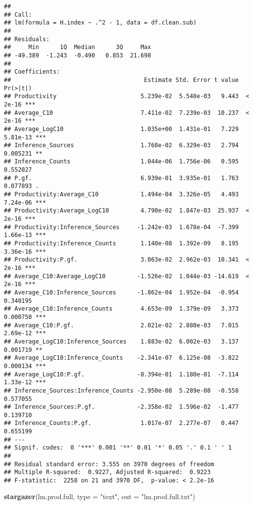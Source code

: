 \documentclass[
]{article}
\newenvironment{Shaded}{\begin{snugshade}}{\end{snugshade}}
\newcommand{\AttributeTok}[1]{\textcolor[rgb]{0.13,0.29,0.53}{#1}}
\newcommand{\FunctionTok}[1]{\textcolor[rgb]{0.13,0.29,0.53}{\textbf{#1}}}
\newcommand{\NormalTok}[1]{#1}
\newcommand{\StringTok}[1]{\textcolor[rgb]{0.31,0.60,0.02}{#1}}
\begin{document}
\begin{verbatim}
## 
## Call:
## lm(formula = H.index ~ .^2 - 1, data = df.clean.sub)
## 
## Residuals:
##     Min      1Q  Median      3Q     Max 
## -49.389  -1.243  -0.490   0.853  21.698 
## 
## Coefficients:
##                                      Estimate Std. Error t value Pr(>|t|)    
## Productivity                        5.239e-02  5.548e-03   9.443  < 2e-16 ***
## Average_C10                         7.411e-02  7.239e-03  10.237  < 2e-16 ***
## Average_LogC10                      1.035e+00  1.431e-01   7.229 5.81e-13 ***
## Inference_Sources                   1.768e-02  6.329e-03   2.794 0.005231 ** 
## Inference_Counts                    1.044e-06  1.756e-06   0.595 0.552027    
## P.gf.                               6.939e-01  3.935e-01   1.763 0.077893 .  
## Productivity:Average_C10            1.494e-04  3.326e-05   4.493 7.24e-06 ***
## Productivity:Average_LogC10         4.790e-02  1.847e-03  25.937  < 2e-16 ***
## Productivity:Inference_Sources     -1.242e-03  1.678e-04  -7.399 1.66e-13 ***
## Productivity:Inference_Counts       1.140e-08  1.392e-09   8.195 3.36e-16 ***
## Productivity:P.gf.                  3.063e-02  2.962e-03  10.341  < 2e-16 ***
## Average_C10:Average_LogC10         -1.526e-02  1.044e-03 -14.619  < 2e-16 ***
## Average_C10:Inference_Sources      -1.862e-04  1.952e-04  -0.954 0.340195    
## Average_C10:Inference_Counts        4.653e-09  1.379e-09   3.373 0.000750 ***
## Average_C10:P.gf.                   2.021e-02  2.880e-03   7.015 2.69e-12 ***
## Average_LogC10:Inference_Sources    1.883e-02  6.002e-03   3.137 0.001719 ** 
## Average_LogC10:Inference_Counts    -2.341e-07  6.125e-08  -3.822 0.000134 ***
## Average_LogC10:P.gf.               -8.394e-01  1.180e-01  -7.114 1.33e-12 ***
## Inference_Sources:Inference_Counts -2.950e-08  5.289e-08  -0.558 0.577055    
## Inference_Sources:P.gf.            -2.358e-02  1.596e-02  -1.477 0.139710    
## Inference_Counts:P.gf.              1.017e-07  2.277e-07   0.447 0.655199    
## ---
## Signif. codes:  0 '***' 0.001 '**' 0.01 '*' 0.05 '.' 0.1 ' ' 1
## 
## Residual standard error: 3.555 on 3970 degrees of freedom
## Multiple R-squared:  0.9227, Adjusted R-squared:  0.9223 
## F-statistic:  2258 on 21 and 3970 DF,  p-value: < 2.2e-16
\end{verbatim}

\begin{Shaded}
\begin{Highlighting}[]
\FunctionTok{stargazer}\NormalTok{(lm.prod.full, }\AttributeTok{type =} \StringTok{"text"}\NormalTok{, }\AttributeTok{out =} \StringTok{"lm.prod.full.txt"}\NormalTok{)}
\end{Highlighting}
\end{Shaded}
\end{document}
